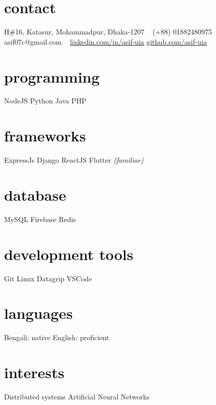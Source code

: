 \documentclass[print]{exponential-cv} %
\begin{document}

\begin{aside}
	\section{contact}
	H\#16, Katasur, Mohammadpur, Dhaka-1207
	~
	(+88) 01882480975
	asif07c@gmail.com
	~
	\href{https://linkedin.com/in/asif-uia}{linkedin.com/in/asif-uia}
	\href{https://github.com/asif-uia}{github.com/asif-uia}
	~
	\section{programming}
	NodeJS
	Python
	Java
	PHP
	~
	\section{frameworks}
	ExpressJs
	Django
	ReactJS
	Flutter \emph{(familiar)}
	~
	\section{database}
	MySQL
	Firebase
	Redis
	~
	\section{development tools}
	Git
	Linux
	Datagrip
	VSCode
	~
	\section{languages}
	Bengali: native
	English: proficient
	~
	\section{interests}
	Distributed systems
	Artificial Neural Networks
\end{aside}






\end{document}
